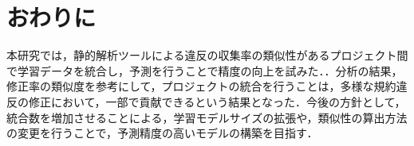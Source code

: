 \documentclass[uplatex,dvipdfmx,a4paper,twocolumn,base=10.5pt,jbase=10.5pt,ja=standard]{bxjsarticle}  %
\begin{document}
\section{おわりに}
本研究では，静的解析ツールによる違反の収集率の類似性があるプロジェクト間で学習データを統合し，予測を行うことで精度の向上を試みた．．分析の結果，修正率の類似度を参考にして，プロジェクトの統合を行うことは，多様な規約違反の修正において，一部で貢献できるという結果となった．今後の方針として，統合数を増加させることによる，学習モデルサイズの拡張や，類似性の算出方法の変更を行うことで，予測精度の高いモデルの構築を目指す．



  
\end{document}
